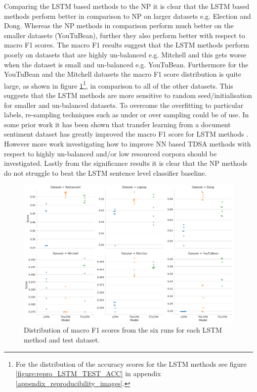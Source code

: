 Comparing the LSTM based methods to the NP it is clear that the LSTM based methods perform better in comparison to NP on larger datasets e.g. Election and Dong. Whereas the NP methods in comparison perform much better on the smaller datasets (YouTuBean), further they also perform better with respect to macro F1 scores. The macro F1 results suggest that the LSTM methods perform poorly on datasets that are highly un-balanced e.g. Mitchell and this gets worse when the dataset is small and un-balanced e.g. YouTuBean. Furthermore for the YouTuBean and the Mitchell datasets the macro F1 score distribution is quite large, as shown in figure \ref{figure:repro_LSTM_TEST_F1}\footnote{For the distribution of the accuracy scores for the LSTM methods see figure \ref{figure:repro_LSTM_TEST_ACC} in appendix \ref{appendix_reproducibility_images}.}, in comparison to all of the other datasets. This suggests that the LSTM methods are more sensitive to random seed/initialisation for smaller and un-balanced datasets. To overcome the overfitting to particular labels, re-sampling techniques such as under or over sampling could be of use. In some prior work it has been shown that transfer learning from a document sentiment dataset has greatly improved the macro F1 score for LSTM methods \citep{he-etal-2018-exploiting}. However more work investigating how to improve NN based TDSA methods with respect to highly un-balanced and/or low resourced corpora should be investigated. Lastly from the significance results it is clear that the NP methods do not struggle to beat the LSTM sentence level classifier baseline.

\begin{figure}[!h]
    \centering
    \includegraphics[scale=0.3]{images/reproducibility/LSTM_Test_F1.pdf}
    \caption{Distribution of macro F1 scores from the six runs for each LSTM method and test dataset.}
    \label{figure:repro_LSTM_TEST_F1}
\end{figure}

